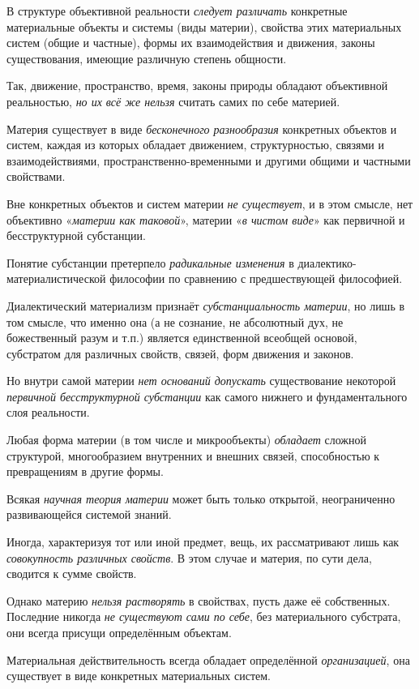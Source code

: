 \documentclass[a4paper,14pt,russian]{extreport}
\begin{document}
В структуре объективной реальности \emph{следует различать} конкретные материальные объекты и системы (виды материи), свойства этих материальных систем (общие и частные), формы их взаимодействия и движения, законы существования, имеющие различную степень общности.

Так, движение, пространство, время, законы природы обладают объективной реальностью, \emph{но их всё же нельзя} считать самих по себе материей.

Материя существует в виде \emph{бесконечного разнообразия} конкретных объектов и систем, каждая из которых обладает движением, структурностью, связями и взаимодействиями, пространственно-временными и другими общими и частными свойствами.

Вне конкретных объектов и систем материи \emph{не существует}, и в этом смысле, нет объективно «\emph{материи как таковой}», материи «\emph{в чистом виде}» как первичной и бесструктурной субстанции.

Понятие субстанции претерпело \emph{радикальные изменения} в диалектико-материалистической философии по сравнению с предшествующей философией.

Диалектический материализм признаёт \emph{субстанциальность материи}, но лишь в том смысле, что именно она (а не сознание, не абсолютный дух, не божественный разум и т.п.) является единственной всеобщей основой, субстратом для различных свойств, связей, форм движения и законов.

Но внутри самой материи \emph{нет оснований допускать} существование некоторой \emph{первичной бесструктурной субстанции} как самого нижнего и фундаментального слоя реальности.

Любая форма материи (в том числе и микрообъекты) \emph{обладает} сложной структурой, многообразием внутренних и внешних связей, способностью к превращениям в другие формы.

Всякая \emph{научная теория материи} может быть только открытой, неограниченно развивающейся системой знаний.

Иногда, характеризуя тот или иной предмет, вещь, их рассматривают лишь как \emph{совокупность различных свойств}. В этом случае и материя, по сути дела, сводится к сумме свойств.

Однако материю \emph{нельзя растворять} в свойствах, пусть даже её собственных. Последние никогда \emph{не существуют сами по себе}, без материального субстрата, они всегда присущи определённым объектам.

Материальная действительность всегда обладает определённой \emph{организацией}, она существует в виде конкретных материальных систем.
\end{document}
